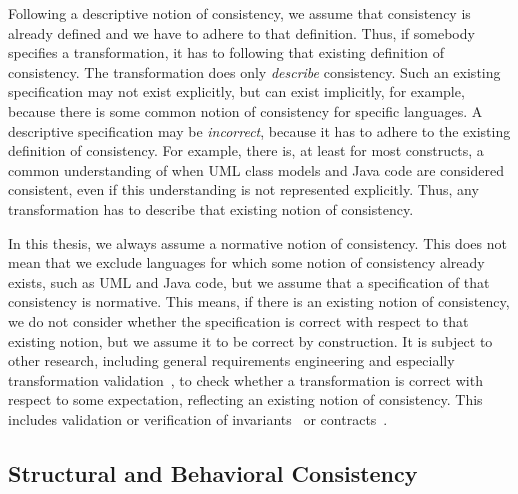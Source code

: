 Following a descriptive notion of consistency, we assume that consistency is already defined and we have to adhere to that definition.
Thus, if somebody specifies a transformation, it has to following that existing definition of consistency. 
The transformation does only \emph{describe} consistency.
Such an existing specification may not exist explicitly, but can exist implicitly, for example, because there is some common notion of consistency for specific languages.
A descriptive specification may be \emph{incorrect}, because it has to adhere to the existing definition of consistency.
For example, there is, at least for most constructs, a common understanding of when \gls{UML} class models and Java code are considered consistent, even if this understanding is not represented explicitly.
Thus, any transformation has to describe that existing notion of consistency.

In this thesis, we always assume a normative notion of consistency.
This does not mean that we exclude languages for which some notion of consistency already exists, such as \gls{UML} and Java code, but we assume that a specification of that consistency is normative.
This means, if there is an existing notion of consistency, we do not consider whether the specification is correct with respect to that existing notion, but we assume it to be correct by construction.
It is subject to other research, including general requirements engineering and especially transformation validation~\cite{rahim2015SurveyTransformationVerification-SoSym}, to check whether a transformation is correct with respect to some expectation, reflecting an existing notion of consistency.
This includes validation or verification of invariants~\cite{cabot2010VerificationInvariants-JSS} or contracts~\cite{azizi2017ContractVerification-ICCKE, vallecillo2012FormalTesting-FMMDE}.


\subsection{Structural and Behavioral Consistency}
\label{chap:networks:notions:types}

